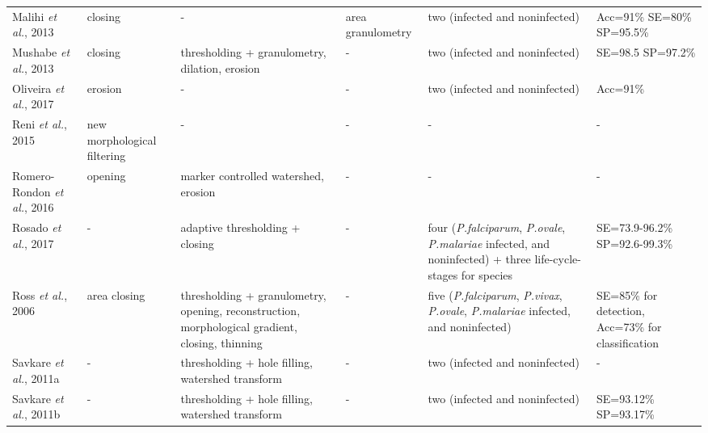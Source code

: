 \begin{longtable}{C{2.1cm} C{2.1cm} C{2.3cm} C{1.5cm} C{2.7cm} C{2.2cm} }
    Malihi \emph{et al.}, 2013  &
    	closing &
    	-  &
    	area granulometry &
    	two (infected and noninfected) &
    	Acc=91\% SE=80\% SP=95.5\% \vspace{0.6cm} \\	

    Mushabe \emph{et al.}, 2013  &
    	closing &
    	thresholding + granulometry, dilation, erosion  &
    	- &
    	two (infected and noninfected) &
    	SE=98.5 SP=97.2\% \vspace{0.6cm} \\	

    Oliveira \emph{et al.}, 2017  &
    	erosion &
    	-  &
    	- &
    	two (infected and noninfected) &
    	Acc=91\% \vspace{0.6cm} \\

    Reni \emph{et al.}, 2015  &
    	new morphological filtering &
    	-  &
    	- &
    	- &
    	- \vspace{0.6cm} \\

    Romero-Rondon \emph{et al.}, 2016  &
    	opening &
    	marker controlled watershed, erosion  &
    	- &
    	- &
    	- \vspace{0.6cm} \\

    Rosado \emph{et al.}, 2017  &
    	- &
    	adaptive thresholding + closing  &
    	- &
    	four (\emph{P.falciparum}, \emph{P.ovale}, \emph{P.malariae} infected, and noninfected) +
    three life-cycle-stages for species &
    	SE=73.9-96.2\% SP=92.6-99.3\% \vspace{0.6cm} \\

    Ross \emph{et al.}, 2006  &
    	area closing &
    	thresholding + granulometry, opening, reconstruction, morphological gradient, closing, thinning  &
        - &
    	five (\emph{P.falciparum}, \emph{P.vivax}, \emph{P.ovale}, \emph{P.malariae} infected, and noninfected) &
    	SE=85\% for detection, Acc=73\% for classification
    	 \vspace{0.6cm} \\


    Savkare \emph{et al.}, 2011a  &
    	- &
    	thresholding + hole filling, watershed transform  &
    	- &
    	two (infected and noninfected) &
    	- \vspace{0.6cm} \\

    Savkare \emph{et al.}, 2011b  &
    	- &
    	thresholding + hole filling, watershed transform  &
    	- &
    	two (infected and noninfected) &
    	SE=93.12\% SP=93.17\% \vspace{0.6cm} \\


\end{longtable}
